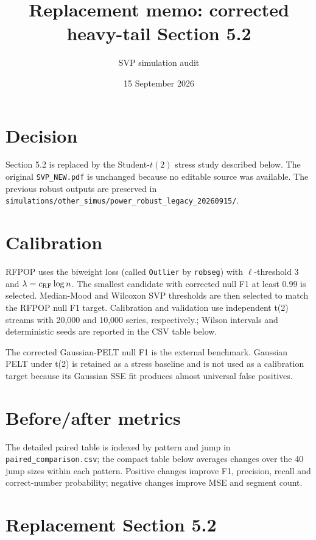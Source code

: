 \documentclass[11pt]{article}
\title{Replacement memo: corrected heavy-tail Section 5.2}
\author{SVP simulation audit}
\date{15 September 2026}
\begin{document}
\maketitle

\section*{Decision}
Section 5.2 is replaced by the Student-$t(2)$ stress study described below.
The original \texttt{SVP\_NEW.pdf} is unchanged because no editable source was
available. The previous robust outputs are preserved in
\texttt{simulations/other\_simus/power\_robust\_legacy\_20260915/}.

\section*{Calibration}
RFPOP uses the biweight loss (called \texttt{Outlier} by \texttt{robseg}) with
$\ell$-threshold 3 and $\lambda=c_{\rm RF}\log n$. The smallest candidate with
corrected null F1 at least 0.99 is selected. Median-Mood and Wilcoxon SVP
thresholds are then selected to match the RFPOP null F1 target. Calibration and
validation use independent t(2) streams with 20,000 and 10,000 series,
respectively.; Wilson intervals and deterministic seeds are reported in the
CSV table below.



The corrected Gaussian-PELT null F1 is the external benchmark. Gaussian PELT
under t(2) is retained as a stress baseline and is not used as a calibration
target because its Gaussian SSE fit produces almost universal false positives.

\section*{Before/after metrics}
The detailed paired table is indexed by pattern and jump in
\texttt{paired\_comparison.csv}; the compact table below averages changes over
the 40 jump sizes within each pattern. Positive changes improve F1, precision,
recall and correct-number probability; negative changes improve MSE and segment
count.



\section*{Replacement Section 5.2}
\end{document}
